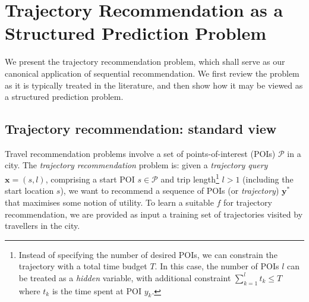 
\section{Trajectory Recommendation as a Structured Prediction Problem}
\label{sec:trajrec}

We present the trajectory recommendation problem,
which shall serve as our canonical application of sequential recommendation.
We first review the problem as it is typically treated in the literature,
and then show how it may be viewed as a structured prediction problem.

%
\subsection{Trajectory recommendation: standard view}

Travel recommendation problems involve a set of points-of-interest (POIs) $\mathcal{P}$ in a city.
The \emph{trajectory recommendation} problem is: given a \emph{trajectory query} $\mathbf{x} = (s, l)$,
comprising a start POI $s \in \mathcal{P}$ and trip length\footnote{Instead of specifying the number of desired POIs, we can constrain the trajectory with a total time budget $T$. In this case, the number of POIs $l$ can be treated as a \emph{hidden} variable, with additional constraint $\sum_{k=1}^l t_k \le T$ where $t_k$ is the time spent at POI $y_k$.}
$l > 1$ (including the start location $s$),
we want to recommend a sequence of POIs (or \emph{trajectory}) $\mathbf{y}^*$ that maximises some notion of utility.
To learn a suitable $f$ for trajectory recommendation,
we are provided as input a training set
of trajectories visited by travellers in the city.

%


